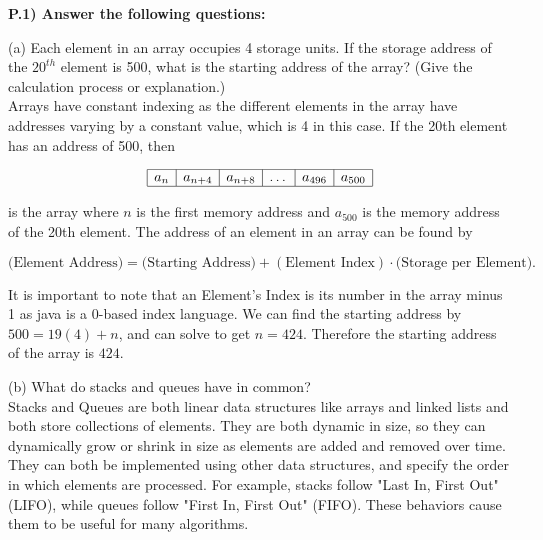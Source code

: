 \documentclass[12pt]{article}
\begin{document}
\pagestyle{fancy}
\setlength{\headheight}{14.49998pt}
\fancyfoot[C]{\thepage}

\noindent \textbf{P.1) Answer the following questions:}

\noindent (a) Each element in an array occupies 4 storage units. If the storage address of the $20^{th}$ element is 500, what is the starting address of the array? (Give the calculation process or explanation.) \\

\indent Arrays have constant indexing as the different elements in the array have addresses varying by a constant value, which is 4 in this case. If the 20th element has an address of 500, then

$$
\begin{array}{|c|c|c|c|c|c|}
\hline
a_{n} & a_{n+4} & a_{n+8} & \dots & a_{496} & a_{500} \\
\hline
\end{array}
$$

\noindent is the array where $n$ is the first memory address and $a_{500}$ is the memory address of the 20th element. The address of an element in an array can be found by

$$ 
\text{(Element Address)}=\text{(Starting Address)}+(\text{Element Index})\cdot\text{(Storage per Element)}.
$$

It is important to note that an Element's Index is its number in the array minus 1 as java is a 0-based index language. We can find the starting address by $500 = 19(4) + n$, and can solve to get $n = 424$. Therefore the starting address of the array is $\boxed{424}$.

\noindent \hdashrule[0.5ex]{\textwidth}{1pt}{3mm 2mm}

\noindent (b) What do stacks and queues have in common? \\

\indent Stacks and Queues are both linear data structures like arrays and linked lists and both store collections of elements. They are both dynamic in size, so they can dynamically grow or shrink in size as elements are added and removed over time. They can both be implemented using other data structures, and specify the order in which elements are processed. For example, stacks follow "Last In, First Out" (LIFO), while queues follow "First In, First Out" (FIFO). These behaviors cause them to be useful for many algorithms.
\end{document}
